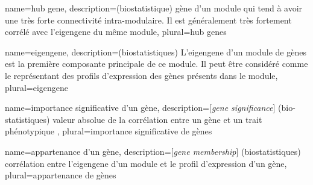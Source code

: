 {
	name={hub gene},
	description={(biostatistique) gène d'un module qui tend à avoir une très forte connectivité intra-modulaire. Il est généralement très fortement corrélé avec l'eigengene du même module}, 
	plural={hub genes}
}

{
	name={eigengene},
	description={(biostatistiques) L'eigengene d'un module de gènes est la première composante principale de ce module. Il peut être considéré comme le représentant des profils d'expression des gènes présents dans le module}, 
	plural={eigengene}
}

{
	name={importance significative d'un g\`ene},
	description={[\textit{gene significance}] (bio-statistiques) valeur absolue de la corrélation entre un gène et un trait phénotypique }, 
	plural={importance significative de g\`enes}
}

{
	name={appartenance d'un g\`ene},
	description={[\textit{gene membership}] (biostatistiques) corrélation entre l'eigengene d'un module et le profil d'expression d'un gène}, 
	plural={appartenance de g\`enes}
}






